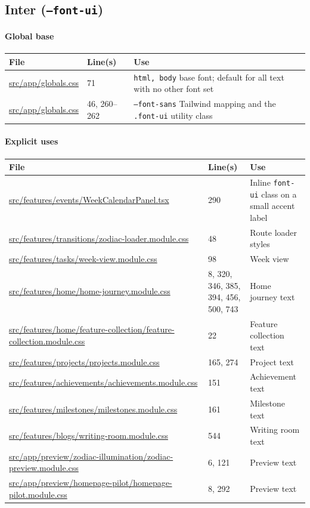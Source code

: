 \documentclass[11pt,a4paper]{article}
\DeclareRobustCommand{\file}[1]{{\ttfamily\small\url{#1}}}
\begin{document}
\subsection{Inter (\texttt{--font-ui})}

\paragraph{Global base}

\begin{longtable}{@{}p{6.4cm}p{2.6cm}p{5.4cm}@{}}
\toprule
File & Line(s) & Use \\
\midrule
\endhead
\file{src/app/globals.css} & 71 & \texttt{html, body} base font; default for all text with no other font set \\
\file{src/app/globals.css} & 46, 260--262 & \texttt{--font-sans} Tailwind mapping and the \texttt{.font-ui} utility class \\
\bottomrule
\end{longtable}

\paragraph{Explicit uses}

\begin{longtable}{@{}p{8.2cm}p{2.6cm}p{3.6cm}@{}}
\toprule
File & Line(s) & Use \\
\midrule
\endhead
\file{src/features/events/WeekCalendarPanel.tsx} & 290 & Inline \texttt{font-ui} class on a small accent label \\
\file{src/features/transitions/zodiac-loader.module.css} & 48 & Route loader styles \\
\file{src/features/tasks/week-view.module.css} & 98 & Week view \\
\file{src/features/home/home-journey.module.css} & 8, 320, 346, 385, 394, 456, 500, 743 & Home journey text \\
\file{src/features/home/feature-collection/feature-collection.module.css} & 22 & Feature collection text \\
\file{src/features/projects/projects.module.css} & 165, 274 & Project text \\
\file{src/features/achievements/achievements.module.css} & 151 & Achievement text \\
\file{src/features/milestones/milestones.module.css} & 161 & Milestone text \\
\file{src/features/blogs/writing-room.module.css} & 544 & Writing room text \\
\file{src/app/preview/zodiac-illumination/zodiac-preview.module.css} & 6, 121 & Preview text \\
\file{src/app/preview/homepage-pilot/homepage-pilot.module.css} & 8, 292 & Preview text \\
\bottomrule
\end{longtable}
\end{document}

